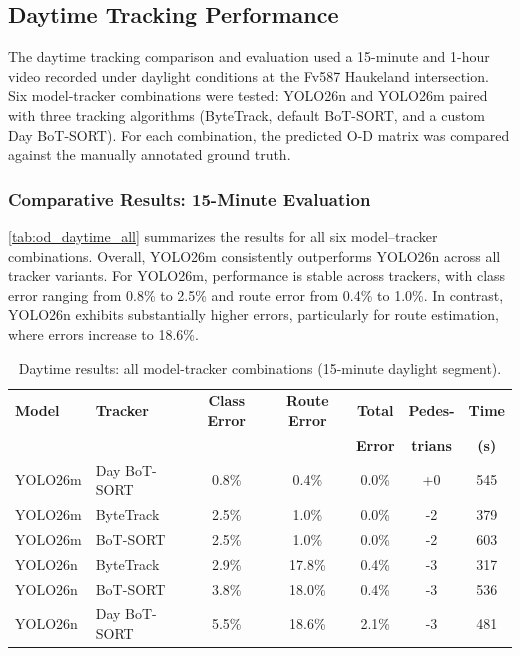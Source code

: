 \subsection{Daytime Tracking Performance}
\label{subsec:daytime_tracking}

The daytime tracking comparison and evaluation used a 15-minute and 1-hour video recorded under daylight conditions at the Fv587 Haukeland intersection. Six model-tracker combinations were tested: YOLO26n and YOLO26m paired with three tracking algorithms (ByteTrack, default BoT-SORT, and a custom Day BoT-SORT). For each combination, the predicted O-D matrix was compared against the manually annotated ground truth.

\subsubsection{Comparative Results: 15-Minute Evaluation}

\autoref{tab:od_daytime_all} summarizes the results for all six model–tracker combinations. Overall, YOLO26m consistently outperforms YOLO26n across all tracker variants. For YOLO26m, performance is stable across trackers, with class error ranging from 0.8\% to 2.5\% and route error from 0.4\% to 1.0\%. In contrast, YOLO26n exhibits substantially higher errors, particularly for route estimation, where errors increase to 18.6\%.

\begin{table}[H]
\caption[Daytime results: all model-tracker combinations]{Daytime results: all model-tracker combinations (15-minute daylight segment).}
\centering
\small
\begin{tabular}{l l c c c c c}
\toprule
\textbf{Model} & \textbf{Tracker} & \textbf{Class Error} & \textbf{Route Error} & \textbf{Total} & \textbf{Pedes-} & \textbf{Time} \\
& & & & \textbf{Error} & \textbf{trians} & \textbf{(s)} \\
\midrule
YOLO26m & Day BoT-SORT & 0.8\% & 0.4\% & 0.0\% & +0 & 545 \\
YOLO26m & ByteTrack & 2.5\% & 1.0\% & 0.0\% & -2 & 379 \\
YOLO26m & BoT-SORT & 2.5\% & 1.0\% & 0.0\% & -2 & 603 \\
YOLO26n & ByteTrack & 2.9\% & 17.8\% & 0.4\% & -3 & 317 \\
YOLO26n & BoT-SORT & 3.8\% & 18.0\% & 0.4\% & -3 & 536 \\
YOLO26n & Day BoT-SORT & 5.5\% & 18.6\% & 2.1\% & -3 & 481 \\
\bottomrule
\end{tabular}
\label{tab:od_daytime_all}
\end{table}

